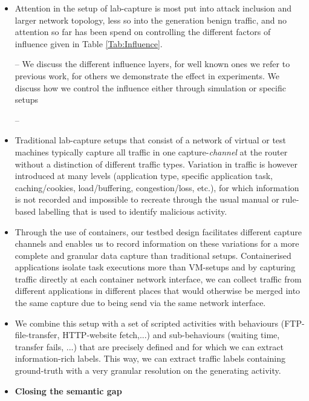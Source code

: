 \documentclass[sigconf]{acmart}
\begin{document}
\begin{itemize}


\item Attention in the setup of lab-capture is most put into attack inclusion and larger network topology, less so into the generation benign traffic, and no attention so far has been spend on controlling the different factors of influence given in Table \ref{Tab:Influence}.

\item[--] We discuss the different influence layers, for well known ones we refer to previous work, for others we demonstrate the effect in experiments. We discuss how we control the influence either through simulation or specific setups

\item[--]

\item Traditional lab-capture setups that consist of a network of virtual or test machines typically capture all traffic in one capture-\textit{channel} at the router without a distinction of different traffic types. Variation in traffic is however introduced at many levels (application type, specific application task, caching/cookies, load/buffering, congestion/loss, etc.), for which information is not  recorded and impossible to recreate through the usual manual or rule-based labelling that is used to identify malicious activity.

\item Through the use of containers, our testbed design facilitates different capture channels and enables us to record  information on these variations for a more complete and granular data capture than traditional setups. Containerised applications isolate task executions more than VM-setups and by capturing traffic directly at each container network interface, we can collect traffic from different applications in different places that would otherwise be merged into the same capture due to being send via the same network interface.

\item We combine this setup with a set of scripted activities with behaviours (FTP-file-transfer, HTTP-website fetch,...) and sub-behaviours (waiting time, transfer fails, ...) that are precisely defined and for which we can extract information-rich labels. This way, we can extract traffic labels containing ground-truth with a very granular resolution on the generating activity.

\item \textbf{Closing the semantic gap}
\begin{itemize}


\end{itemize}
\end{itemize}
\end{document}
